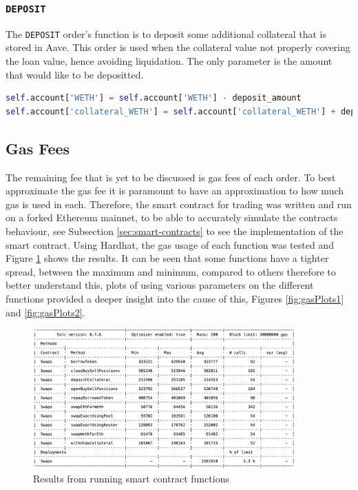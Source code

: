 \subsubsection{\texttt{DEPOSIT}}
The \texttt{DEPOSIT} order's function is to deposit some additional collateral that is stored in Aave. This order is used when the collateral value not properly covering the loan value, hence avoiding liquidation. The only parameter is the amount that would like to be depositted. 
\vspace{5mm}
\begin{lstlisting}[language=Python]
self.account['WETH'] = self.account['WETH'] - deposit_amount
self.account['collateral_WETH'] = self.account['collateral_WETH'] + deposit_amount
\end{lstlisting}

\subsection{Gas Fees}
The remaining fee that is yet to be discussed is gas fees of each order. To best approximate the gas fee it is paramount to have an approximation to how much gas is used in each. Therefore, the smart contract for trading was written and run on a forked Ethereum mainnet, to be able to accurately simulate the contracts behaviour, see Subsection \ref{sec:smart-contracts} to see the implementation of the smart contract. Using Hardhat, the gas usage of each function was tested and Figure \ref{fig:gasResult} shows the results. It can be seen that some functions have a tighter spread, between the maximum and minimum, compared to others therefore to better understand this, plots of using various parameters on the different functions provided a deeper insight into the cause of this, Figures \ref{fig:gasPlots1} and \ref{fig:gasPlots2}.
\begin{figure}[!htb]
    \centering
    \includegraphics[width=0.9\textwidth]{project/Images/gas_fee_results.png}
    \caption{Results from running smart contract functions \label{fig:gasResult}}
\end{figure}


